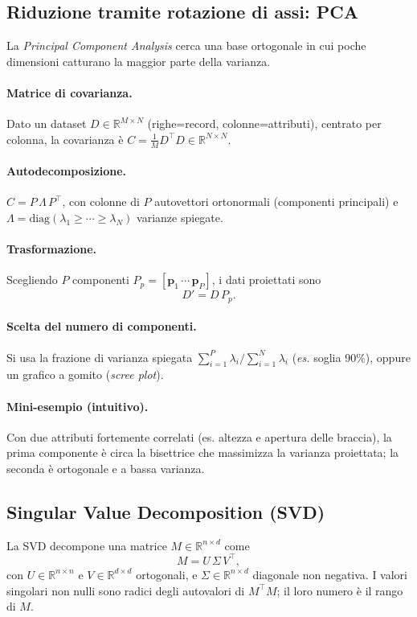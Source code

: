 \subsection{Riduzione tramite rotazione di assi: PCA}\label{subsec:pca}
La \emph{Principal Component Analysis} cerca una base ortogonale in cui poche dimensioni catturano la maggior parte della varianza.
\paragraph{Matrice di covarianza.} Dato un dataset $D\in\mathbb{R}^{M\times N}$ (righe=record, colonne=attributi), centrato per colonna, la covarianza è $C=\tfrac{1}{M}D^\top D\in\mathbb{R}^{N\times N}$.
\paragraph{Autodecomposizione.} $C=P\,\Lambda\,P^\top$, con colonne di $P$ autovettori ortonormali (componenti principali) e $\Lambda=\mathrm{diag}(\lambda_1\ge\cdots\ge\lambda_N)$ varianze spiegate.
\paragraph{Trasformazione.} Scegliendo $P$ componenti $P_p=[\mathbf{p}_1\,\cdots\,\mathbf{p}_P]$, i dati proiettati sono
\[
  D' = D\,P_p.\label{eq:pca-transform}
\]
\paragraph{Scelta del numero di componenti.} Si usa la frazione di varianza spiegata $\sum_{i=1}^P\lambda_i/\sum_{i=1}^N\lambda_i$ (\emph{es.} soglia 90\%), oppure un grafico a gomito (\emph{scree plot}).
\paragraph{Mini-esempio (intuitivo).} Con due attributi fortemente correlati (es. altezza e apertura delle braccia), la prima componente è circa la bisettrice che massimizza la varianza proiettata; la seconda è ortogonale e a bassa varianza.

\subsection{Singular Value Decomposition (SVD)}\label{subsec:svd}
La SVD decompone una matrice $M\in\mathbb{R}^{n\times d}$ come
\[
  M = U\,\Sigma\,V^\top,
\]
con $U\in\mathbb{R}^{n\times n}$ e $V\in\mathbb{R}^{d\times d}$ ortogonali, e $\Sigma\in\mathbb{R}^{n\times d}$ diagonale non negativa. I valori singolari non nulli sono radici degli autovalori di $M^\top M$; il loro numero è il rango di $M$.
